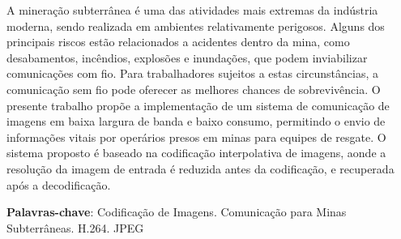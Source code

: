 \begin{resumo}

A mineração subterrânea é uma das atividades mais extremas da indústria moderna, sendo realizada em ambientes relativamente perigosos. Alguns dos principais riscos estão relacionados a acidentes dentro da mina, como desabamentos, incêndios, explosões e inundações, que podem inviabilizar comunicações com fio. Para trabalhadores sujeitos a estas circunstâncias, a comunicação sem fio pode oferecer as melhores chances de sobrevivência. O presente trabalho propõe a implementação de um sistema de comunicação de imagens em baixa largura de banda e baixo consumo, permitindo o envio de informações vitais por operários presos em minas para equipes de resgate. O sistema proposto é baseado na codificação interpolativa de imagens, aonde a resolução da imagem de entrada é reduzida antes da codificação, e recuperada após a decodificação. 


\vspace{\onelineskip}
    
 \noindent
 \textbf{Palavras-chave}: Codificação de Imagens. Comunicação para Minas Subterrâneas. H.264. JPEG 
\end{resumo}
